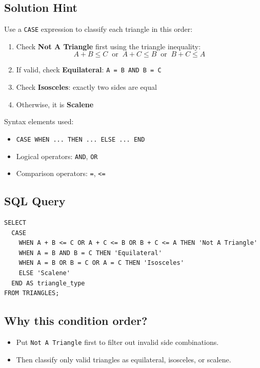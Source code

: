 \documentclass[12pt,a4paper]{article}
\begin{document}
\subsection*{Solution Hint}
Use a \texttt{CASE} expression to classify each triangle in this order:
\begin{enumerate}
    \item Check \textbf{Not A Triangle} first using the triangle inequality:
    \[
    A+B \le C \;\; \text{or} \;\; A+C \le B \;\; \text{or} \;\; B+C \le A
    \]
    \item If valid, check \textbf{Equilateral}: \texttt{A = B AND B = C}
    \item Check \textbf{Isosceles}: exactly two sides are equal
    \item Otherwise, it is \textbf{Scalene}
\end{enumerate}
Syntax elements used:
\begin{itemize}
    \item \texttt{CASE WHEN ... THEN ... ELSE ... END}
    \item Logical operators: \texttt{AND}, \texttt{OR}
    \item Comparison operators: \texttt{=}, \texttt{<=}
\end{itemize}

\subsection*{SQL Query}
\begin{lstlisting}[style=sqlstyle]
SELECT
  CASE
    WHEN A + B <= C OR A + C <= B OR B + C <= A THEN 'Not A Triangle'
    WHEN A = B AND B = C THEN 'Equilateral'
    WHEN A = B OR B = C OR A = C THEN 'Isosceles'
    ELSE 'Scalene'
  END AS triangle_type
FROM TRIANGLES;
\end{lstlisting}

\subsection*{Why this condition order?}
\begin{itemize}
    \item Put \texttt{Not A Triangle} first to filter out invalid side combinations.
    \item Then classify only valid triangles as equilateral, isosceles, or scalene.
\end{itemize}
\end{document}
